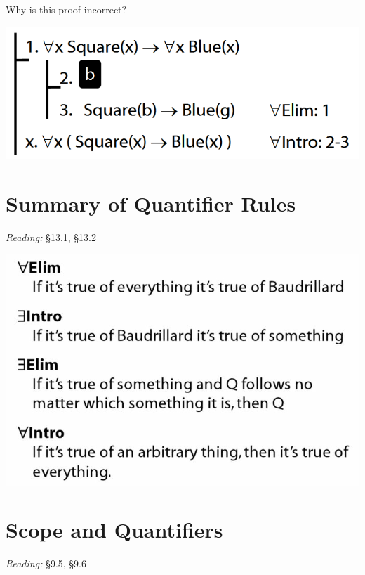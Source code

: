 \documentclass[12pt]{extarticle}
\begin{document}
\begin{multicols*}{3}
\begin{minipage}{\columnwidth}
Why is this proof incorrect?
 
\begin{center}
\includegraphics[scale=0.3]{img/proof_universal_intro_incorrect.png}
\end{center}
\end{minipage}
 
 
 
\section{Summary of Quantifier Rules}
 
\emph{Reading:} §13.1, §13.2
 
\begin{center}
\includegraphics[scale=0.3]{img/quantifier_rule_summary.png}
\end{center}
 
 
\section{Scope and Quantifiers}
 
\emph{Reading:} §9.5, §9.6
 
\begin{minipage}{\columnwidth}
 

\end{minipage}
\end{multicols*}
\end{document}
